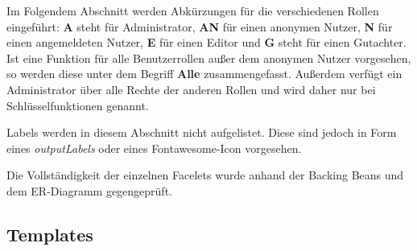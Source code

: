 \newcommand{\ftable}[1]{\begin{longtable}[H]{|m{2cm}|m{3cm}|m{6cm}|m{2.5cm}|}
                            \hline
                            \textbf{ID} & \textbf{Typ} & \textbf{Beschreibung} & \textbf{Rechte} \\
                            \hline
                            \hline
                            #1
\end{longtable}
}

\newcommand{\fentry}[4]{#1 & #2 & #3 & #4 \\
\hline}



Im Folgendem Abschnitt werden Abkürzungen für die verschiedenen Rollen eingeführt:
\textbf{A} steht für Administrator, \textbf{AN} für einen anonymen Nutzer, \textbf{N} für einen angemeldeten Nutzer, \textbf{E} für einen Editor und \textbf{G} steht für einen Gutachter.
Ist eine Funktion für alle Benutzerrollen außer dem anonymen Nutzer vorgesehen, so werden diese unter dem Begriff \textbf{Alle} zusammengefasst.
Außerdem verfügt ein Administrator über alle Rechte der anderen Rollen und wird daher nur bei Schlüsselfunktionen genannt.

Labels werden in diesem Abschnitt nicht aufgelistet.
Diese sind jedoch in Form eines \emph{outputLabels} oder eines Fontawesome-Icon vorgesehen.

Die Vollständigkeit der einzelnen Facelets wurde anhand der Backing Beans und dem ER-Diagramm gegengeprüft.

\subsection{Templates}



